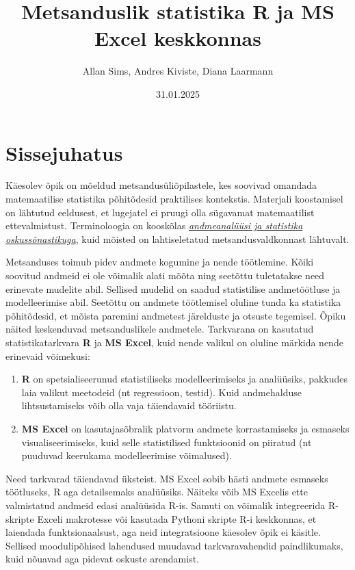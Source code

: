 \documentclass[
]{book}
\title{Metsanduslik statistika R ja MS Excel keskkonnas}
\author{Allan Sims, Andres Kiviste, Diana Laarmann}
\date{31.01.2025}
\providecommand{\tightlist}{%
  \setlength{\itemsep}{0pt}\setlength{\parskip}{0pt}}
\theoremstyle{definition}
\theoremstyle{definition}
\theoremstyle{definition}
\theoremstyle{definition}
\theoremstyle{remark}
\begin{document}
\maketitle

{
\setcounter{tocdepth}{1}
\tableofcontents
}
\chapter{Sissejuhatus}\label{sissejuhatus}

Käesolev õpik on mõeldud metsandusüliõpilastele, kes soovivad omandada matemaatilise statistika põhitõdesid praktilises kontekstis. Materjali koostamisel on lähtutud eeldusest, et lugejatel ei pruugi olla sügavamat matemaatilist ettevalmistust. Terminoloogia on kooskõlas \emph{\href{https://sonaveeb.ee/ds/aso}{andmeanalüüsi ja statistika oskussõnastikuga}}, kuid mõisted on lahtiseletatud metsandusvaldkonnast lähtuvalt.

Metsanduses toimub pidev andmete kogumine ja nende töötlemine. Kõiki soovitud andmeid ei ole võimalik alati mõõta ning seetõttu tuletatakse need erinevate mudelite abil. Sellised mudelid on saadud statistilise andmetöötluse ja modelleerimise abil. Seetõttu on andmete töötlemisel oluline tunda ka statistika põhitõdesid, et mõista paremini andmetest järelduste ja otsuste tegemisel. Õpiku näited keskenduvad metsanduslikele andmetele. Tarkvarana on kasutatud statistikatarkvara \textbf{R} ja \textbf{MS Excel}, kuid nende valikul on oluline märkida nende erinevaid võimekusi:

\begin{enumerate}
\def\labelenumi{\arabic{enumi}.}
\tightlist
\item
  \textbf{R} on spetsialiseerunud statistiliseks modelleerimiseks ja analüüsiks, pakkudes laia valikut meetodeid (nt regressioon, testid). Kuid andmehalduse lihtsustamiseks võib olla vaja täiendavaid tööriistu.\\
\item
  \textbf{MS Excel} on kasutajasõbralik platvorm andmete korrastamiseks ja esmaseks visualiseerimiseks, kuid selle statistilised funktsioonid on piiratud (nt puuduvad keerukama modelleerimise võimalused).
\end{enumerate}

Need tarkvarad täiendavad üksteist. MS Excel sobib hästi andmete esmaseks töötluseks, R aga detailsemaks analüüsiks. Näiteks võib MS Excelis ette valmistatud andmeid edasi analüüsida R-is. Samuti on võimalik integreerida R-skripte Exceli makrotesse või kasutada Pythoni skripte R-i keskkonnas, et laiendada funktsionaalsust, aga neid integratsioone käesolev õpik ei käsitle. Sellised moodulipõhised lahendused muudavad tarkvaravahendid paindlikumaks, kuid nõuavad aga pidevat oskuste arendamist.
\end{document}
